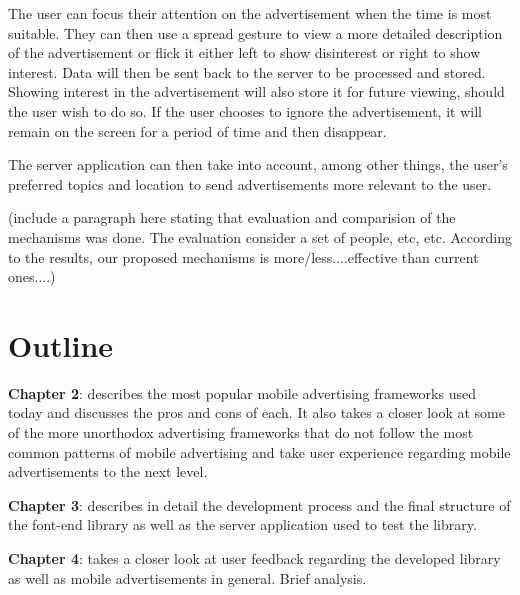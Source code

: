 The user can focus their attention on the advertisement when the time is most suitable. They can then use a spread gesture to view a more detailed description of the advertisement or flick it either left to show disinterest or right to show interest. Data will then be sent back to the server to be processed and stored. Showing interest in the advertisement will also store it for future viewing, should the user wish to do so. If the user chooses to ignore the advertisement, it will remain on the screen for a period of time and then disappear.

The server application can then take into account, among other things, the user's preferred topics and location to send advertisements more relevant to the user.


(include a paragraph here stating that evaluation and comparision of the mechanisms was done. The evaluation consider a set of people, etc, etc. According to the results, our proposed mechanisms is more/less....effective than current ones....)


\section{Outline}
\noindent \textbf{Chapter 2}: describes the most popular mobile advertising frameworks used today and discusses the pros and cons of each. It also takes a closer look at some of the more unorthodox advertising frameworks that do not follow the most common patterns of mobile advertising and take user experience regarding mobile advertisements to the next level.

\noindent \textbf{Chapter 3}: describes in detail the development process and the final structure of the font-end library as well as the server application used to test the library.

\noindent \textbf{Chapter 4}: takes a closer look at user feedback regarding the developed library as well as mobile advertisements in general. Brief analysis.
